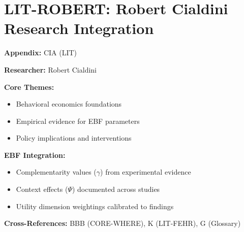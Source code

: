 %
%

\chapter{LIT-ROBERT: Robert Cialdini Research Integration}
\label{app:cia}

\begin{abstract}
This appendix integrates the research contributions of Robert Cialdini into the
Evidence-Based Framework. It documents key papers, core findings, and their
integration with EBF dimensions including complementarity parameters ($\gamma$),
context factors ($\Psi$), and utility dimensions.
\end{abstract}

\begin{tcolorbox}[colback=blue!5!white, colframe=blue!75!black,
    title=Quick Reference: Robert Cialdini Research]

\textbf{Appendix:} CIA (LIT)

\textbf{Researcher:} Robert Cialdini

\textbf{Core Themes:}
\begin{itemize}[nosep]
\item Behavioral economics foundations
\item Empirical evidence for EBF parameters
\item Policy implications and interventions
\end{itemize}

\textbf{EBF Integration:}
\begin{itemize}[nosep]
\item Complementarity values ($\gamma$) from experimental evidence
\item Context effects ($\Psi$) documented across studies
\item Utility dimension weightings calibrated to findings
\end{itemize}

\textbf{Cross-References:} BBB (CORE-WHERE), K (LIT-FEHR), G (Glossary)
\end{tcolorbox}

